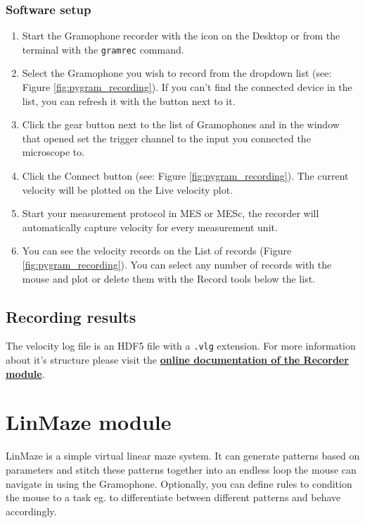 \documentclass[11pt,a4paper]{article}
\begin{document}
\subsubsection{Software setup}
\begin{enumerate}
\item Start the Gramophone recorder with the icon on the Desktop or from the terminal with the \texttt{gramrec} command.
\item Select the Gramophone you wish to record from the dropdown list (see: Figure \ref{fig:pygram_recording}). If you can't find the connected device in the list, you can refresh it with the button next to it.
\item Click the gear button next to the list of Gramophones and in the window that opened set the trigger channel to the input you connected the microscope to.
\item Click the Connect button (see: Figure \ref{fig:pygram_recording}). The current velocity will be plotted on the Live velocity plot.
\item Start your measurement protocol in MES or MESc, the recorder will automatically capture velocity for every measurement unit.
\item You can see the velocity records on the List of records (Figure \ref{fig:pygram_recording}). You can select any number of records with the mouse and plot or delete them with the Record tools below the list.

\end{enumerate}

\subsection{Recording results \label{sec:recorder_out}}
The velocity log file is an HDF5 file with a \texttt{.vlg} extension. For more information about it's structure please visit the \href{http://gramophone.femtonics.eu/gramrec_out.html}{\textbf{online documentation of the Recorder module}}.

\section{LinMaze module}
LinMaze is a simple virtual linear maze system. It can generate patterns based on parameters and stitch these patterns together into an endless loop the mouse can navigate in using the Gramophone. Optionally, you can define rules to condition the mouse to a task eg. to differentiate between different patterns and behave accordingly.
\end{document}
